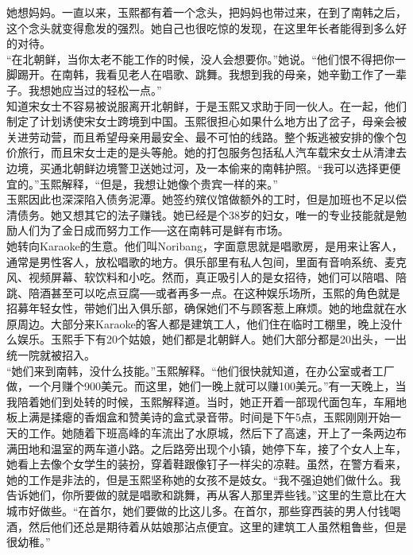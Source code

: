 她想妈妈。一直以来，玉熙都有着一个念头，把妈妈也带过来，在到了南韩之后，这个念头就变得愈发的强烈。她自己也很吃惊的发现，在这里年长者能得到多么好的对待。\\

“在北朝鲜，当你太老不能工作的时候，没人会想要你。”她说。“他们恨不得把你一脚踢开。在南韩，我看见老人在唱歌、跳舞。我想到我的母亲，她辛勤工作了一辈子。我想她应当过的轻松一点。”\\

知道宋女士不容易被说服离开北朝鲜，于是玉熙又求助于同一伙人。在一起，他们制定了计划诱使宋女士跨境到中国。玉熙很担心如果什么地方出了岔子，母亲会被关进劳动营，而且希望母亲用最安全、最不可怕的线路。整个叛逃被安排的像个包价旅行，而且宋女士走的是头等舱。她的打包服务包括私人汽车载宋女士从清津去边境，买通北朝鲜边境警卫送她过河，及一本偷来的南韩护照。“我可以选择更便宜的。”玉熙解释，“但是，我想让她像个贵宾一样的来。”\\

玉熙因此也深深陷入债务泥潭。她签约殡仪馆做额外的工时，但是加班也不足以偿清债务。她又想其它的法子赚钱。她已经是个38岁的妇女，唯一的专业技能就是勉励人们为了金日成而努力工作──这在南韩可是鲜有市场。\\

她转向Karaoke的生意。他们叫Noribang，字面意思就是唱歌房，是用来让客人，通常是男性客人，放松唱歌的地方。俱乐部里有私人包间，里面有音响系统、麦克风、视频屏幕、软饮料和小吃。然而，真正吸引人的是女招待，她们可以陪唱、陪跳、陪酒甚至可以吃点豆腐──或者再多一点。在这种娱乐场所，玉熙的角色就是招募年轻女性，带她们出入俱乐部，确保她们不与顾客惹上麻烦。她的地盘就在水原周边。大部分来Karaoke的客人都是建筑工人，他们住在临时工棚里，晚上没什么娱乐。玉熙手下有20个姑娘，她们都是北朝鲜人。她们大部分都是20出头，一出统一院就被招入。\\

“她们来到南韩，没什么技能。”玉熙解释。“他们很快就知道，在办公室或者工厂做，一个月赚个900美元。而这里，她们一晚上就可以赚100美元。”有一天晚上，当我陪着她们到处转的时候，玉熙解释道。当时，她正开着一部现代面包车，车厢地板上满是揉瘪的香烟盒和赞美诗的盒式录音带。时间是下午5点，玉熙刚刚开始一天的工作。她随着下班高峰的车流出了水原城，然后下了高速，开上了一条两边布满田地和温室的两车道小路。之后路旁出现个小镇，她停下车，接了个女人上车，她看上去像个女学生的装扮，穿着鞋跟像钉子一样尖的凉鞋。虽然，在警方看来，她的工作是非法的，但是玉熙坚称她的女孩不是妓女。“我不强迫她们做什么。我告诉她们，你所要做的就是唱歌和跳舞，再从客人那里弄些钱。”这里的生意比在大城市好做些。“在首尔，她们要做的比这儿多。在首尔，那些穿西装的男人付钱喝酒，然后他们还总是期待着从姑娘那沾点便宜。这里的建筑工人虽然粗鲁些，但是很幼稚。”\\

